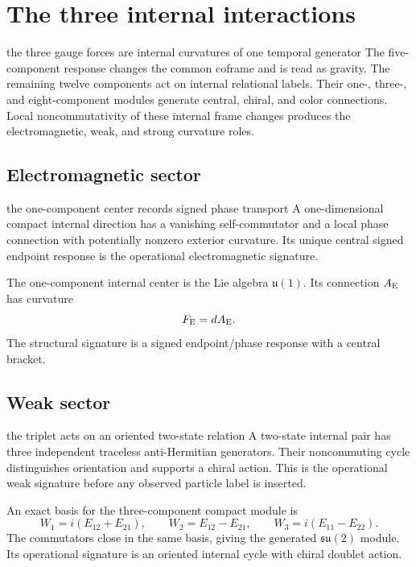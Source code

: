 \documentclass[11pt]{article}
\numberwithin{equation}{section}
\theoremstyle{remark}
\begin{document}
\section{The three internal interactions}
\begin{conceptledger}{the three gauge forces are internal curvatures of one temporal generator}
The five-component response changes the common coframe and is read as gravity. The remaining twelve components act on internal relational labels. Their one-, three-, and eight-component modules generate central, chiral, and color connections. Local noncommutativity of these internal frame changes produces the electromagnetic, weak, and strong curvature roles.
\end{conceptledger}

\label{sec:internal}

\subsection{Electromagnetic sector}
\begin{interpretivebridge}{the one-component center records signed phase transport}
A one-dimensional compact internal direction has a vanishing self-commutator and a local phase connection with potentially nonzero exterior curvature. Its unique central signed endpoint response is the operational electromagnetic signature.
\end{interpretivebridge}

The one-component internal center is the Lie algebra $\mathfrak u(1)$. Its connection $A_{\rm E}$ has curvature
\begin{equation}
F_{\rm E}=dA_{\rm E}.
\end{equation}
The structural signature is a signed endpoint/phase response with a central bracket.

\subsection{Weak sector}
\begin{interpretivebridge}{the triplet acts on an oriented two-state relation}
A two-state internal pair has three independent traceless anti-Hermitian generators. Their noncommuting cycle distinguishes orientation and supports a chiral action. This is the operational weak signature before any observed particle label is inserted.
\end{interpretivebridge}

An exact basis for the three-component compact module is
\begin{equation}
W_1=i(E_{12}+E_{21}),\qquad
W_2=E_{12}-E_{21},\qquad
W_3=i(E_{11}-E_{22}).
\end{equation}
The commutators close in the same basis, giving the generated $\mathfrak{su}(2)$ module. Its operational signature is an oriented internal cycle with chiral doublet action.
\end{document}
